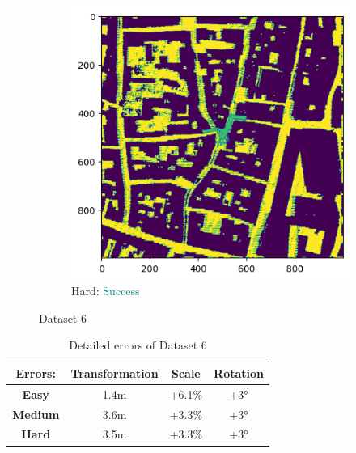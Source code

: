 \documentclass[11pt]{article}
\begin{document}
\begin{figure}[p]
        \vspace{1em}

        \begin{subfigure}{0.45\textwidth}
            \centering
            \includegraphics[width=\linewidth]{images/full/hard/5_7_1_hard}
            \caption{Hard: \textcolor{teal}{Success}}
            \label{fig:5_7_1_hard}
        \end{subfigure}
        \hfill

        \caption{Dataset 6}
        \label{fig:res_5_7_1}
    \end{figure}

    \begin{table}[p]
        \centering
        \begin{tabular}{|c|c|c|c|}
          \hline
          \textbf{Errors:} & \textbf{Transformation} & \textbf{Scale} & \textbf{Rotation} \\
          \hline
          \textbf{Easy}   & 1.4m  & +6.1\% & +3° \\
          \hline
          \textbf{Medium} & 3.6m  & +3.3\% & +3° \\
          \hline
          \textbf{Hard}   & 3.5m  & +3.3\% & +3° \\
          \hline
        \end{tabular}
        \caption{Detailed errors of Dataset 6}
        \label{tab:tab_6}
    \end{table}
\end{document}
